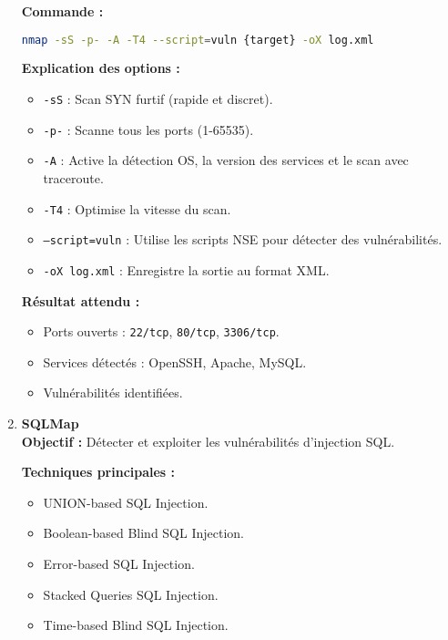 \begin{justify}
\begin{enumerate}[left=0cm]
        \textbf{Commande :}
        \begin{lstlisting}[language=bash]
        nmap -sS -p- -A -T4 --script=vuln {target} -oX log.xml
        \end{lstlisting}
        
        \textbf{Explication des options :}
        \begin{itemize}[label=$\bullet$]
            \item \texttt{-sS} : Scan SYN furtif (rapide et discret).
            \item \texttt{-p-} : Scanne tous les ports (1-65535).
            \item \texttt{-A} : Active la détection OS, la version des services et le scan avec traceroute.
            \item \texttt{-T4} : Optimise la vitesse du scan.
            \item \texttt{--script=vuln} : Utilise les scripts NSE pour détecter des vulnérabilités.
            \item \texttt{-oX log.xml} : Enregistre la sortie au format XML.
        \end{itemize}
        
        \textbf{Résultat attendu :}
        \begin{itemize}[label=$\bullet$]
            \item Ports ouverts : \texttt{22/tcp}, \texttt{80/tcp}, \texttt{3306/tcp}.
            \item Services détectés : OpenSSH, Apache, MySQL.
            \item Vulnérabilités identifiées.
        \end{itemize}
    \item \textbf{SQLMap} \\
        \textbf{Objectif :} Détecter et exploiter les vulnérabilités d'injection SQL.
        
        \textbf{Techniques principales :}
        \begin{itemize}[label=$\bullet$]
            \item UNION-based SQL Injection.
            \item Boolean-based Blind SQL Injection.
            \item Error-based SQL Injection.
            \item Stacked Queries SQL Injection.
            \item Time-based Blind SQL Injection.
        \end{itemize}
        

\end{enumerate}
\end{justify}
